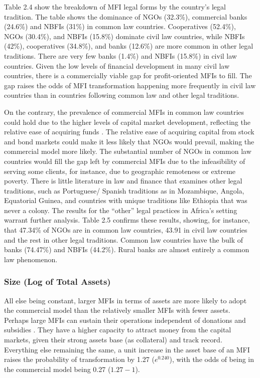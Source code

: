 \documentclass[a4paper, nobind]{templates/ociamthesis}
\begin{document}
Table 2.4 show the breakdown of MFI legal forms by the country's legal tradition. The table shows the dominance of NGOs (32.3\%), commercial banks (24.6\%) and NBFIs (31\%) in common law countries. Cooperatives (52.4\%), NGOs (30.4\%), and NBFIs (15.8\%) dominate civil law countries, while NBFIs (42\%), cooperatives (34.8\%), and banks (12.6\%) are more common in other legal traditions. There are very few banks (1.4\%) and NBFIs (15.8\%) in civil law countries. Given the low levels of financial development in many civil law countries, there is a commercially viable gap for profit-oriented MFIs to fill. The gap raises the odds of MFI transformation happening more frequently in civil law countries than in countries following common law and other legal traditions.

On the contrary, the prevalence of commercial MFIs in common law countries could hold due to the higher levels of capital market development, reflecting the relative ease of acquiring funds \autocite{schnyder2018twenty}. The relative ease of acquiring capital from stock and bond markets could make it less likely that NGOs would prevail, making the commercial model more likely. The substantial number of NGOs in common law countries would fill the gap left by commercial MFIs due to the infeasibility of serving some clients, for instance, due to geographic remoteness or extreme poverty. There is little literature in law and finance that examines other legal traditions, such as Portuguese/ Spanish traditions as in Mozambique, Angola, Equatorial Guinea, and countries with unique traditions like Ethiopia that was never a colony. The results for the ``other'' legal practices in Africa's setting warrant further analysis. Table 2.5 confirms these results, showing, for instance, that 47.34\% of NGOs are in common law countries, 43.91 in civil law countries and the rest in other legal traditions. Common law countries have the bulk of banks (74.47\%) and NBFIs (44.2\%). Rural banks are almost entirely a common law phenomenon.

\hypertarget{size-log-of-total-assets}{%
\subsubsection{Size (Log of Total Assets)}\label{size-log-of-total-assets}}

All else being constant, larger MFIs in terms of assets are more likely to adopt the commercial model than the relatively smaller MFIs with fewer assets. Perhaps large MFIs can sustain their operations independent of donations and subsidies \autocite{d2013unsubsidized}. They have a higher capacity to attract money from the capital markets, given their strong assets base (as collateral) and track record. Everything else remaining the same, a unit increase in the asset base of an MFI raises the probability of transformation by 1.27 (\(e^{0.240}\)), with the odds of being in the commercial model being 0.27 (\(1.27 - 1\)).
\end{document}
